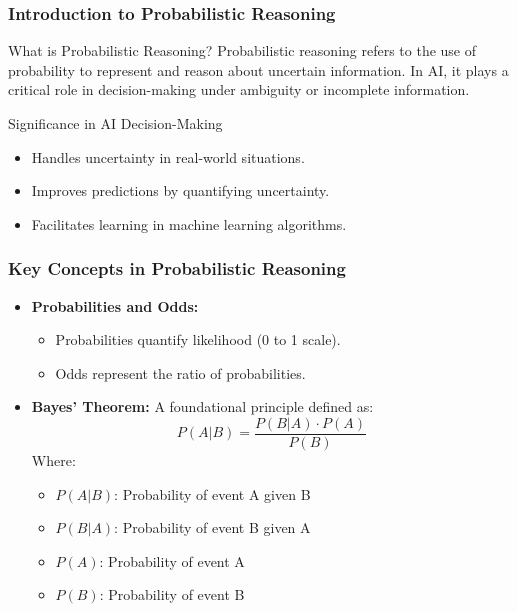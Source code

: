 \documentclass[aspectratio=169]{beamer}
\begin{document}
\frame{\titlepage}

\begin{frame}[fragile]
  \frametitle{Introduction to Probabilistic Reasoning}
  \begin{block}{What is Probabilistic Reasoning?}
    Probabilistic reasoning refers to the use of probability to represent and reason about uncertain information. In AI, it plays a critical role in decision-making under ambiguity or incomplete information. 
  \end{block}
  
  \begin{block}{Significance in AI Decision-Making}
    \begin{itemize}
      \item Handles uncertainty in real-world situations.
      \item Improves predictions by quantifying uncertainty.
      \item Facilitates learning in machine learning algorithms.
    \end{itemize}
  \end{block}
\end{frame}

\begin{frame}[fragile]
  \frametitle{Key Concepts in Probabilistic Reasoning}
  \begin{itemize}
    \item \textbf{Probabilities and Odds:} 
      \begin{itemize}
        \item Probabilities quantify likelihood (0 to 1 scale).
        \item Odds represent the ratio of probabilities.
      \end{itemize}
    \item \textbf{Bayes’ Theorem:} 
      A foundational principle defined as:
      \begin{equation}
        P(A|B) = \frac{P(B|A) \cdot P(A)}{P(B)}
      \end{equation}
      Where:
      \begin{itemize}
        \item $P(A|B)$: Probability of event A given B
        \item $P(B|A)$: Probability of event B given A
        \item $P(A)$: Probability of event A
        \item $P(B)$: Probability of event B
      \end{itemize}
  \end{itemize}
\end{frame}
\end{document}
